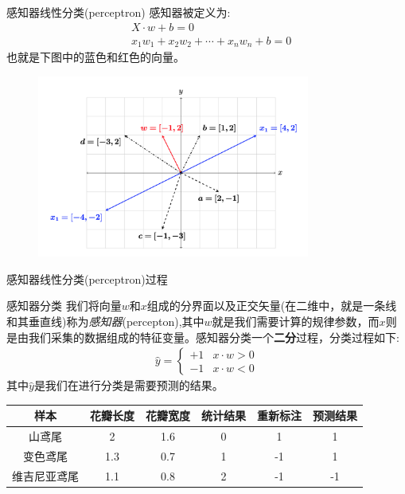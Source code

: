 \documentclass[handout]{ctexbeamer}
\begin{document}
\begin{frame}{感知器线性分类(perceptron)}
感知器被定义为:
\begin{align*}
	& X \cdot w + b  = 0 \\
	& x_1 w_1 + x_2 w_2 + \cdots + x_n w_n + b  =0
\end{align*}	
也就是下图中的蓝色和红色的向量。
\begin{figure}[H]
	\centering
	\includegraphics[width=0.8\textwidth]{fig/C2C2dotprodt}
\end{figure}	
\end{frame}

\begin{frame}{感知器线性分类(perceptron)过程}
	\begin{block}{感知器分类}
	我们将向量$w$和$x$组成的分界面以及正交矢量(在二维中，就是一条线和其垂直线)称为\textit{感知器}(percepton),其中$w$就是我们需要计算的规律参数，而$x$则是由我们采集的数据组成的特征变量。感知器分类一个\textbf{二分}过程，分类过程如下:
	\begin{align*}
		\hat{y} = \begin{cases}
			+1 & x \cdot w > 0 \\
			-1 & x \cdot w < 0
		\end{cases}
	\end{align*}
	其中$\hat{y}$是我们在进行分类是需要预测的结果。	
	\end{block}
\begin{table}[H]
	\centering
	\begin{tabular}{cccccc}
		\hline 
		样本 & 花瓣长度 & 花瓣宽度 & 统计结果 & 重新标注 & 预测结果 \\
		\hline 
		山鸢尾 & 2 & 1.6 & 0 & 1 & 1  \\
		变色鸢尾 & 1.3 & 0.7 & 1 & -1 & 1  \\
		维吉尼亚鸢尾 & 1.1 & 0.8 & 2 & -1 &  -1 \\
		\hline  
	\end{tabular}
\end{table}
\end{frame}
\end{document}
